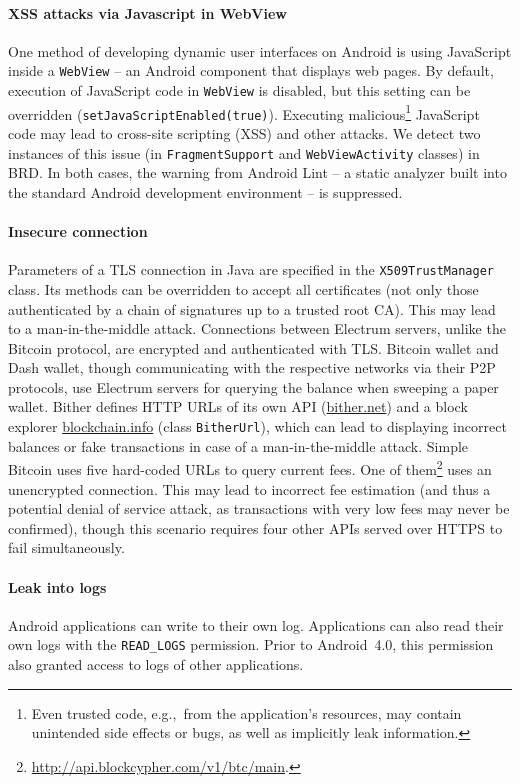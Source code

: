 \paragraph{XSS attacks via Javascript in WebView}
One method of developing dynamic user interfaces on Android is using JavaScript inside a \texttt{WebView} -- an Android component that displays web pages.
By default, execution of JavaScript code in \texttt{WebView} is disabled, but this setting can be overridden (\texttt{setJavaScriptEnabled(true)}).
Executing malicious\footnote{Even trusted code, e.g.,~from the application's resources, may contain unintended side effects or bugs, as well as implicitly leak information.} JavaScript code may lead to cross-site scripting (XSS) and other attacks.
We detect two instances of this issue (in \texttt{FragmentSupport} and \texttt{WebViewActivity} classes) in BRD\@.
In both cases, the warning from Android Lint -- a static analyzer built into the standard Android development environment -- is suppressed.

\paragraph{Insecure connection}
Parameters of a TLS connection in Java are specified in the \texttt{X509TrustManager} class.
Its methods can be overridden to accept all certificates (not only those authenticated by a chain of signatures up to a trusted root CA).
This may lead to a man-in-the-middle attack.
Connections between Electrum servers, unlike the Bitcoin protocol, are encrypted and authenticated with TLS\@.
Bitcoin wallet and Dash wallet, though communicating with the respective networks via their P2P protocols, use Electrum servers for querying the balance when sweeping a paper wallet.
Bither defines HTTP URLs of its own API (\url{bither.net}) and a block explorer \url{blockchain.info} (class \texttt{BitherUrl}), which can lead to displaying incorrect balances or fake transactions in case of a man-in-the-middle attack.
Simple Bitcoin uses five hard-coded URLs to query current fees.
One of them\footnote{\url{http://api.blockcypher.com/v1/btc/main}.} uses an unencrypted connection.
This may lead to incorrect fee estimation (and thus a potential denial of service attack, as transactions with very low fees may never be confirmed), though this scenario requires four other APIs served over HTTPS to fail simultaneously.

\paragraph{Leak into logs}
Android applications can write to their own log.
Applications can also read their own logs with the \texttt{READ\_LOGS} permission.
Prior to Android~4.0, this permission also granted access to logs of other applications.

